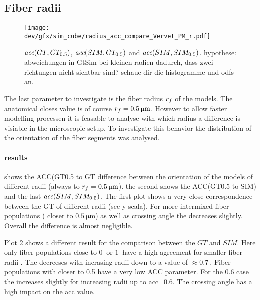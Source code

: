 \subsection{Fiber radii}
% 
\begin{figure}[!t]
\centering
\texttt{[image: dev/gfx/sim\_cube/radius\_acc\_compare\_Vervet\_PM\_r.pdf]}
\caption[sim acc]{ $\textit{acc}{}(GT,GT_{0.5})$, $\textit{acc}{}(SIM,GT_{0.5})$ and $\textit{acc}{}(SIM,SIM_{0.5})$. hypothese: abweichungen in GtSim bei kleinen radien dadurch, dass zwei richtungen nicht sichtbar sind? schaue dir die histogramme und odfs an. }
\label{fig:accVervetPMr}
\end{figure}
% 
The last parameter to investigate is the fiber radius $\textnormal{$r_f$}{}$ of the models.
The anatomical closes value is of course $\fiberRadius{} = \SI{0.5}{\micro\meter}$.
However to allow faster modelling processen it is feasable to analyse with which radius a difference is visiable in the microscopic setup.
To investigate this behavior the distribution of the orientation of the fiber segments was analysed.
\par
% 
\paragraph{results}
 shows the ACC(GT0.5 to GT difference between the orientation of the models of different radii (always to $\fiberRadius{} = \SI{0.5}{\micro\meter}$).
the second shows the ACC(GT0.5 to SIM) and the last $\textit{acc}{}(SIM,SIM_{0.5})$.
% 
The first plot shows a very close correspondence between the GT of different radii (see y scala).
For more intermixed fiber populations (\modelPsi{} closer to $\SI{0.5}{\micro\meter}$) as well as crossing angle \modelOmega{} the \acc{} decreases slightly.
Overall the difference is almost negligible.
\par
%
Plot 2 shows a different result for the comparison between the $GT$ and $SIM$.
Here only fiber populations \modelPsi{} close to $\SI{0}{}$ or $\SI{1}{}$ have a high agreement for smaller fiber radii \fiberRadius{}.
The \acc{} decreeses with incrasing radii \fiberRadius{} down to a value of $\approx \SI{0.7}{}$.
Fiber populations with \modelPsi{} closer to 0.5 have a very low ACC parameter. For the 0.6 case the \acc{} increases slightly for increasing radii up to acc=0.6.
The crossing angle has a high impact on the acc value. 
% 
